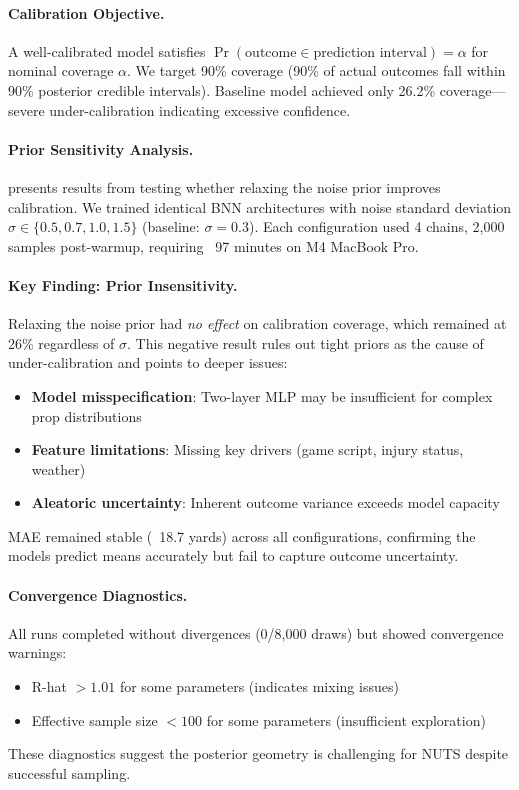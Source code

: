 \paragraph{Calibration Objective.}
A well-calibrated model satisfies $\Pr(\text{outcome} \in \text{prediction interval}) = \alpha$ for nominal coverage $\alpha$. We target 90\% coverage (90\% of actual outcomes fall within 90\% posterior credible intervals). Baseline model achieved only 26.2\% coverage—severe under-calibration indicating excessive confidence.

\paragraph{Prior Sensitivity Analysis.}
 presents results from testing whether relaxing the noise prior improves calibration. We trained identical BNN architectures with noise standard deviation $\sigma \in \{0.5, 0.7, 1.0, 1.5\}$ (baseline: $\sigma=0.3$). Each configuration used 4 chains, 2,000 samples post-warmup, requiring ~97 minutes on M4 MacBook Pro.



\paragraph{Key Finding: Prior Insensitivity.}
Relaxing the noise prior had \emph{no effect} on calibration coverage, which remained at 26\% regardless of $\sigma$. This negative result rules out tight priors as the cause of under-calibration and points to deeper issues:
\begin{itemize}
  \item \textbf{Model misspecification}: Two-layer MLP may be insufficient for complex prop distributions
  \item \textbf{Feature limitations}: Missing key drivers (game script, injury status, weather)
  \item \textbf{Aleatoric uncertainty}: Inherent outcome variance exceeds model capacity
\end{itemize}

MAE remained stable (~18.7 yards) across all configurations, confirming the models predict means accurately but fail to capture outcome uncertainty.

\paragraph{Convergence Diagnostics.}
All runs completed without divergences (0/8,000 draws) but showed convergence warnings:
\begin{itemize}
  \item R-hat $> 1.01$ for some parameters (indicates mixing issues)
  \item Effective sample size $< 100$ for some parameters (insufficient exploration)
\end{itemize}
These diagnostics suggest the posterior geometry is challenging for NUTS despite successful sampling.

